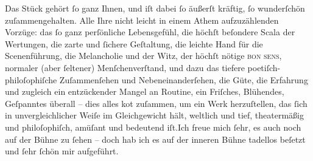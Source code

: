 \pstart
           Das Stück gehört ſo ganz Ihnen, und iſt dabei ſo äußerſt kräftig, ſo wunderſchön
               zuſammengehalten. Alle Ihre nicht leicht in einem Athem aufzuzählenden Vorzüge: das
               ſo ganz perſönliche Lebensgefühl, die höchſt beſondere Scala der Wertungen, {\pb}die zarte und ſichere Geſtaltung,
               die leichte Hand für die Scenenführung, die Melancholie und der Witz, der höchſt
               nötige \textsc{bon sens}, normaler (aber ſeltener) Menſchenverſtand,
               und dazu das tiefere poetiſch-philoſophiſche Zuſammenſehen und Nebeneinanderſehen,
               die Güte, die Erfahrung und zugleich ein entzückender Mangel an Routine, ein
               Friſches, Blühendes, Geſpanntes überall – dies alles ko{\geminationm}t zuſammen, um ein {\pb}Werk
               herzuſtellen, das ſich in unvergleichlicher Weiſe im Gleichgewicht hält, weltlich und
               tief, theatermäßig und philoſophiſch, amüſant und bedeutend iſt.\hspace*{1.5em}Ich freue mich ſehr, es auch noch auf der Bühne zu ſehen – doch hab
               ich es auf der inneren Bühne tadellos beſetzt und ſehr ſchön mir aufgeführt.\pend
           
